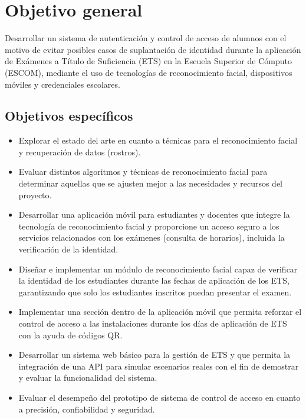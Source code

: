 \section{Objetivo general}

Desarrollar un sistema de autenticación y control de acceso de alumnos con el motivo de evitar posibles casos de suplantación de identidad durante la aplicación de Exámenes a Título de Suficiencia (ETS) en la Escuela Superior de Cómputo (ESCOM), mediante el uso de tecnologías de reconocimiento facial, dispositivos móviles y credenciales escolares.


\subsection{Objetivos específicos}

\begin{itemize}
	\item Explorar el estado del arte en cuanto a técnicas para el reconocimiento facial y recuperación de datos (rostros).
	\item Evaluar distintos algoritmos y técnicas de reconocimiento facial para determinar aquellas que se ajusten mejor a las necesidades y recursos del proyecto.
	\item Desarrollar una aplicación móvil para estudiantes y docentes que integre la tecnología de reconocimiento facial y proporcione un acceso seguro a los servicios relacionados con los exámenes (consulta de horarios), incluida la verificación de la identidad.
	\item Diseñar e implementar un módulo de reconocimiento facial capaz de verificar la identidad de los estudiantes durante las fechas de aplicación de los ETS, garantizando que solo los estudiantes inscritos puedan presentar el examen.
	\item Implementar una sección dentro de la aplicación móvil que permita reforzar el control de acceso a las instalaciones durante los días de aplicación de ETS con la ayuda de códigos QR.
	\item Desarrollar un sistema web básico para la gestión de ETS y que permita la integración de una API para simular escenarios reales con el fin de demostrar y evaluar la funcionalidad del sistema.
	\item Evaluar el desempeño del prototipo de sistema de control de acceso en cuanto a precisión, confiabilidad y seguridad.
	
\end{itemize}

